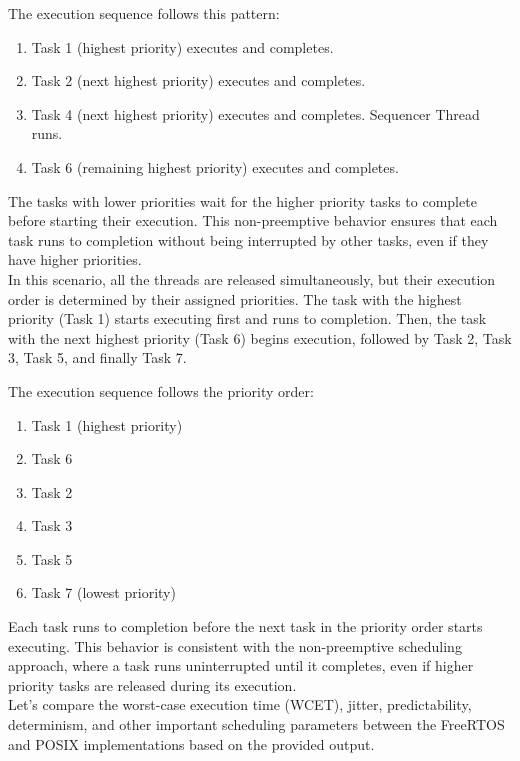 \documentclass[a4paper,11pt]{article}%
\newenvironment{qanda}{\setlength{\parindent}{0pt}}{\bigskip}
\begin{document}
\begin{qanda}
\begin{enumerate}
			The execution sequence follows this pattern:
			\begin{enumerate}
				\item Task 1 (highest priority) executes and completes.
				\item Task 2 (next highest priority) executes and completes.
				\item Task 4 (next highest priority) executes and completes.
				      Sequencer Thread runs.
				\item Task 6 (remaining highest priority) executes and completes.
			\end{enumerate}

			The tasks with lower priorities wait for the higher priority tasks to complete before starting their execution. This non-preemptive behavior ensures that each task runs to completion without being interrupted by other tasks, even if they have higher priorities.\\


			In this scenario, all the threads are released simultaneously, but their execution order is determined by their assigned priorities. The task with the highest priority (Task 1) starts executing first and runs to completion. Then, the task with the next highest priority (Task 6) begins execution, followed by Task 2, Task 3, Task 5, and finally Task 7.

			The execution sequence follows the priority order:
			\begin{enumerate}
				\item Task 1 (highest priority)
				\item Task 6
				\item Task 2
				\item Task 3
				\item Task 5
				\item Task 7 (lowest priority)
			\end{enumerate}


			Each task runs to completion before the next task in the priority order starts executing. This behavior is consistent with the non-preemptive scheduling approach, where a task runs uninterrupted until it completes, even if higher priority tasks are released during its execution.\\


			Let's compare the worst-case execution time (WCET), jitter, predictability, determinism, and other important scheduling parameters between the FreeRTOS and POSIX implementations based on the provided output.\\


\end{enumerate}
\end{qanda}
\end{document}
